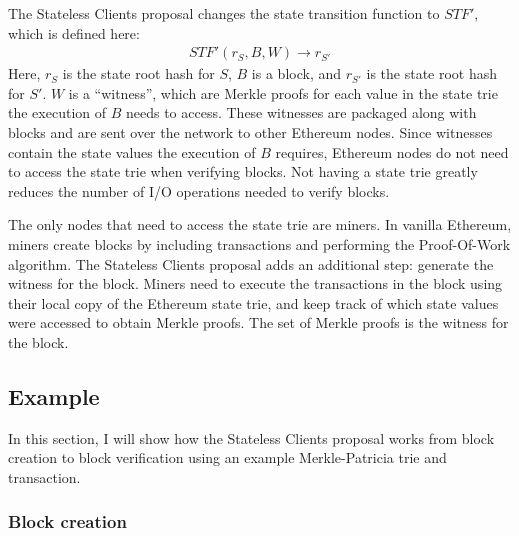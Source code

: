 \documentclass[12pt]{article}
\newcommand{\System}{Stateless Clients\xspace}
\begin{document}
The \System proposal changes the state transition function to $STF'$, which is defined here:
\begin{align*}
  STF'(r_S, B, W) \to r_{S'}
\end{align*}
Here, $r_S$ is the state root hash for $S$, $B$ is a block, and $r_{S'}$ is the state root hash for $S'$. $W$ is a ``witness'', which are Merkle proofs for each value in the state trie the execution of $B$ needs to access. These witnesses are packaged along with blocks and are sent over the network to other Ethereum nodes. Since witnesses contain the state values the execution of $B$ requires, Ethereum nodes do not need to access the state trie when verifying blocks. Not having a state trie greatly reduces the number of I/O operations needed to verify blocks.

The only nodes that need to access the state trie are miners. In vanilla Ethereum, miners create blocks by including transactions and performing the Proof-Of-Work algorithm. The \System proposal adds an additional step: generate the witness for the block. Miners need to execute the transactions in the block using their local copy of the Ethereum state trie, and keep track of which state values were accessed to obtain Merkle proofs. The set of Merkle proofs is the witness for the block.

\subsection{Example}

In this section, I will show how the \System proposal works from block creation to block verification using an example Merkle-Patricia trie and transaction.

\subsubsection{Block creation}
\end{document}
